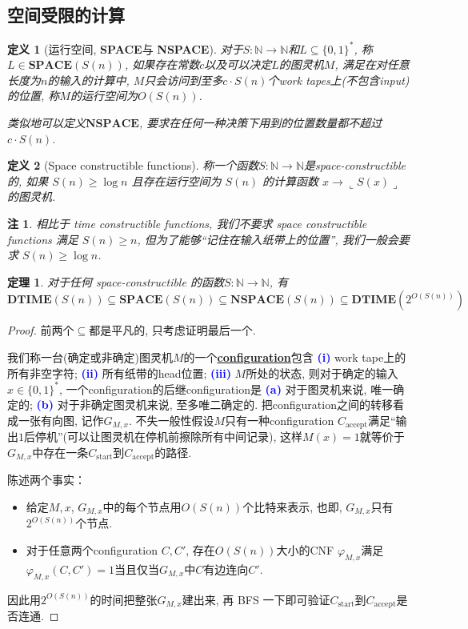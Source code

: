 \documentclass[8pt]{article}
\theoremstyle{compact}
\newtheorem{theorem}{定理}[section]
\newtheorem{definition}{定义}[section]
\newtheorem{remark}{注}[section]
\def\obj#1{\textbf{\uline{#1}}}
\def\num#1{\textnormal{\textbf{\mbox{\textcolor{blue}{(#1)}}}}}
\def\ge{\geqslant}
\def\rep#1{\llcorner{#1}\lrcorner}
\def\DTIME{\textbf{DTIME}}
\def\SPACE{\textbf{SPACE}}
\def\NSPACE{\textbf{NSPACE}}
\begin{document}
\subsection{空间受限的计算}
\begin{definition}[运行空间, \SPACE 与 \NSPACE]
	对于$S: \mathbb N \to \mathbb N$和$L \subseteq \{0, 1\}^*$, 称$L \in \SPACE(S(n))$, 如果存在常数$c$以及可以决定$L$的图灵机$M$, 满足在对任意长度为$n$的输入的计算中, $M$只会访问到至多$c \cdot S(n)$个work tapes上(不包含input)的位置, 称$M$的运行空间为$O(S(n))$. 

	类似地可以定义$\NSPACE$, 要求在任何一种决策下用到的位置数量都不超过$c \cdot S(n)$. 
\end{definition}
\begin{definition}[Space constructible functions]
	称一个函数$S: \mathbb N \to \mathbb N$是space-constructible的, 如果 $S(n) \ge \log n$ 且存在运行空间为 $S(n)$ 的计算函数 $x \to \rep{S(x)}$ 的图灵机.
\end{definition}
\begin{remark}
	相比于 time constructible functions, 我们不要求 space constructible functions 满足 $S(n) \ge n$, 但为了能够“记住在输入纸带上的位置”, 我们一般会要求 $S(n) \ge \log n$. 
\end{remark}
\begin{theorem}
	对于任何 space-constructible 的函数$S: \mathbb N \to \mathbb N$, 有
	$$\DTIME(S(n)) \subseteq \SPACE(S(n)) \subseteq \NSPACE(S(n)) \subseteq \DTIME(2^{O(S(n))})$$
	\label{time_and_space}
\end{theorem}
\begin{proof}
	前两个$\subseteq$都是平凡的, 只考虑证明最后一个. 

	我们称一台(确定或非确定)图灵机$M$的一个\obj{configuration}包含 \num{i} work tape上的所有非空字符; \num{ii} 所有纸带的head位置; \num{iii} $M$所处的状态, 则对于确定的输入$x \in \{0, 1\}^*$, 一个configuration的后继configuration是 \num{a} 对于图灵机来说, 唯一确定的; \num{b} 对于非确定图灵机来说, 至多唯二确定的. 把configuration之间的转移看成一张有向图, 记作$G_{M, x}$. 不失一般性假设$M$只有一种configuration $C_{\text{accept}}$满足“输出$1$后停机”(可以让图灵机在停机前擦除所有中间记录), 这样$M(x) = 1$就等价于$G_{M, x}$中存在一条$C_{\text{start}}$到$C_{\text{accept}}$的路径. 

	陈述两个事实：
	\begin{itemize}
		\item 给定$M, x$, $G_{M, x}$中的每个节点用$O(S(n))$个比特来表示, 也即, $G_{M, x}$只有$2^{O(S(n))}$个节点. 
		\item 对于任意两个configuration $C, C'$, 存在$O(S(n))$大小的CNF $\varphi_{M, x}$满足$\varphi_{M, x}(C, C') = 1$当且仅当$G_{M, x}$中$C$有边连向$C'$. 
	\end{itemize}

	因此用$2^{O(S(n))}$的时间把整张$G_{M, x}$建出来, 再 BFS 一下即可验证$C_{\text{start}}$到$C_{\text{accept}}$是否连通. 
\end{proof}
\end{document}
